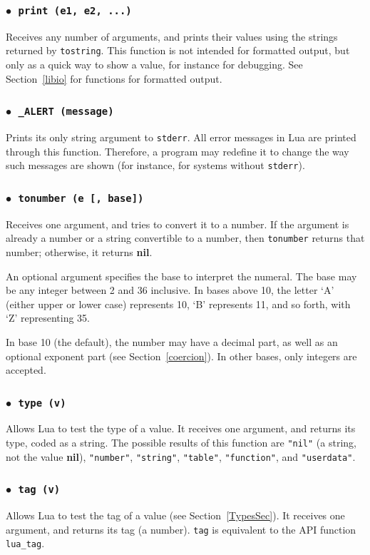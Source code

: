 \documentclass[11pt]{article}
\newcommand{\See}[1]{Section~\ref{#1}}
\newcommand{\see}[1]{(see \See{#1})}
\newcommand{\T}[1]{{\tt #1}}
\newcommand{\nil}{{\bf nil}}
\newcommand{\IndexVerb}[1]{\T{#1}\index{#1}}
\newcommand{\Deffunc}[1]{\index{#1}}
\newcommand{\ff}{$\bullet$\ }
\begin{document}
\subsubsection*{\ff \T{print (e1, e2, ...)}}\Deffunc{print}
Receives any number of arguments,
and prints their values using the strings returned by \verb|tostring|.
This function is not intended for formatted output,
but only as a quick way to show a value,
for instance for debugging.
See \See{libio} for functions for formatted output.

\subsubsection*{\ff \T{_ALERT (message)}}\Deffunc{alert}\label{alert}
Prints its only string argument to \IndexVerb{stderr}.
All error messages in Lua are printed through this function.
Therefore, a program may redefine it
to change the way such messages are shown
(for instance, for systems without \verb|stderr|).

\subsubsection*{\ff \T{tonumber (e [, base])}}\Deffunc{tonumber}
Receives one argument,
and tries to convert it to a number.
If the argument is already a number or a string convertible
to a number, then \verb|tonumber| returns that number;
otherwise, it returns \nil.

An optional argument specifies the base to interpret the numeral.
The base may be any integer between 2 and 36 inclusive.
In bases above  10, the letter `A' (either upper or lower case)
represents 10, `B' represents 11, and so forth, with `Z' representing 35.

In base 10 (the default), the number may have a decimal part,
as well as an optional exponent part \see{coercion}.
In other bases, only integers are accepted.

\subsubsection*{\ff \T{type (v)}}\Deffunc{type}\label{pdf-type}
Allows Lua to test the type of a value.
It receives one argument, and returns its type, coded as a string.
The possible results of this function are
\verb|"nil"| (a string, not the value \nil),
\verb|"number"|,
\verb|"string"|,
\verb|"table"|,
\verb|"function"|,
and \verb|"userdata"|.

\subsubsection*{\ff \T{tag (v)}}\Deffunc{tag}
Allows Lua to test the tag of a value \see{TypesSec}.
It receives one argument, and returns its tag (a number).
\verb|tag| is equivalent to the API function \verb|lua_tag|.
\end{document}
